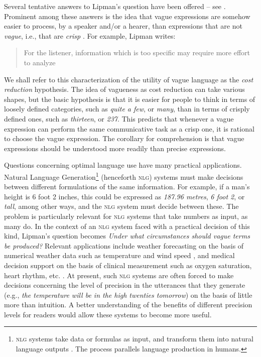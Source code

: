 \documentclass[graybox,envcountchap,sectrefs%
,footinfo
]{svmono}
\begin{document}
Several tentative answers to Lipman's question have been offered -- see \citet{van2009utility, van2010vagueness}. Prominent among these answers is the idea that vague expressions are somehow easier to process, by a speaker and/or a hearer, than expressions that are not \emph{vague}, i.e., that are \emph{crisp} \citep[e.g.,][]{lipmanvague,De-Jaegher:2003lr,vanrooij2003lr}. For example, Lipman writes: \begin{quotation}For the listener, information which is too specific may require more effort to analyze \citep[][p.\ 11]{lipmanvague}  \end{quotation} We shall refer to this characterization of the utility of vague language as the \emph{cost reduction} hypothesis. The idea of vagueness as cost reduction can take various shapes, but the basic hypothesis is that it is easier for people to think in terms of loosely defined categories, such as \emph{quite a few}, or \emph{many}, than in terms of crisply defined ones, such as \emph{thirteen}, or \emph{237}. This predicts that whenever a vague expression can perform the same communicative task as a crisp one, it is rational to choose the vague expression. The corollary for comprehension is that vague expressions should be understood more readily than precise expressions. 

Questions concerning optimal language use have many practical applications. Natural Language Generation\footnote{\textsc{nlg} systems take data or formulas as input, and transform them into natural language outputs \cite[][]{reiter2000building}. The process parallels language production in humans.}  (henceforth \textsc{nlg}) systems must make decisions between different formulations of the same information. For example, if a man's height is 6 foot 2 inches, this could be expressed as \emph{187.96 metres}, \emph{6 foot 2}, or \emph{tall}, among other ways, and the \textsc{nlg} system must decide between these.  The problem is particularly relevant for \textsc{nlg} systems that take numbers as input, as many do. In the context of an \textsc{nlg} system faced with a practical decision of this kind, Lipman's question becomes \emph{Under what circumstances should vague terms be produced?}  Relevant applications include weather forecasting on the basis of numerical weather data such as temperature and wind speed \citep{goldberg1994using, turner2006generating}, and medical decision support on the basis of clinical measurement such as oxygen saturation, heart rhythm, etc. \citep{Hripcsak01032009, hunter2008summarising, portet2009automatic}. At present, such \textsc{nlg} systems are often forced to make decisions concerning the level of precision in the utterances that they generate (e.g., \emph{the temperature will be in the high twenties tomorrow}) on the basis of little more than intuition. A better understanding of the benefits of different precision levels for readers would allow these systems to become more useful. 
\end{document}
